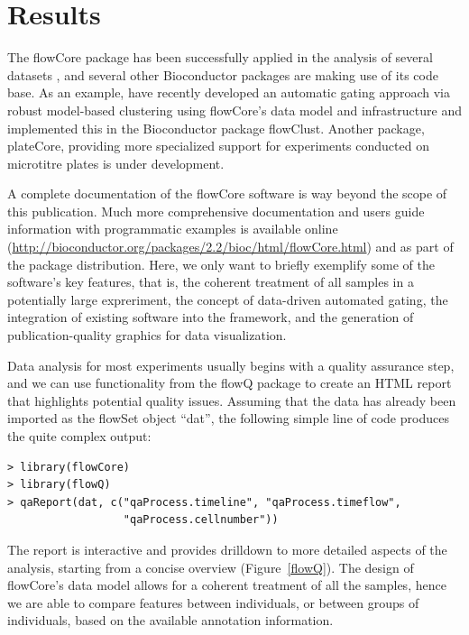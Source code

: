 \documentclass[12pt]{article}
\begin{document}
\section*{Results}
The flowCore package has been successfully applied in the analysis of
several datasets \citep{gasparetto2004ice,brinkman2007hcf}, and
several other Bioconductor packages are making use of its code
base. As an example, \cite{lo2008agf} have recently developed an
automatic gating approach via robust model-based clustering using
flowCore's data model and infrastructure and implemented this in the
Bioconductor package flowClust. Another package, plateCore, providing
more specialized support for experiments conducted on microtitre
plates is under development.

A complete documentation of the flowCore software is way beyond the
scope of this publication. Much more comprehensive documentation and
users guide information with programmatic examples is available online
(\url{http://bioconductor.org/packages/2.2/bioc/html/flowCore.html})
and as part of the package distribution. Here, we only want to briefly
exemplify some of the software's key features, that is, the coherent
treatment of all samples in a potentially large expreriment, the
concept of data-driven automated gating, the integration of existing
software into the framework, and the generation of publication-quality
graphics for data visualization.

Data analysis for most experiments usually begins with a quality
assurance step, and we can use functionality from the flowQ package to
create an HTML report that highlights potential quality
issues. Assuming that the data has already been imported as the
flowSet object ``dat'', the following simple line of code produces the
quite complex output:

\begin{verbatim}
> library(flowCore)
> library(flowQ)
> qaReport(dat, c("qaProcess.timeline", "qaProcess.timeflow", 
                  "qaProcess.cellnumber"))
\end{verbatim}

The report is interactive and provides drilldown to more detailed
aspects of the analysis, starting from a concise overview
(Figure~\ref{flowQ}). The design of flowCore's data model allows for a
coherent treatment of all the samples, hence we are able to compare
features between individuals, or between groups of individuals, based
on the available annotation information.
\end{document}
